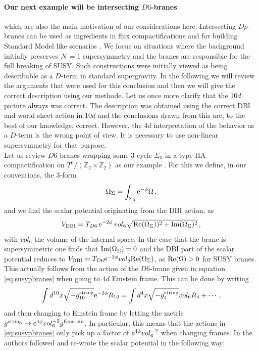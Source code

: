 \documentclass[12pt]{report}
\newcommand{\be}{\begin{equation}}
\newcommand{\ee}{\end{equation}}
\def\rme{{\rm e}}
\def\rmre{{\rm Re}}
\def\rmim{{\rm Im}}
\begin{document}
\paragraph{Our next example will be intersecting $D6$-branes} which are also the main motivation of our considerations here. Intersecting $Dp$-branes can be used as ingredients in flux compactifications and for building Standard Model like scenarios \cite{Blumenhagen:2006ci,Blumenhagen:2005mu}. We focus on situations where the background initially preserves $\mathcal{N}=1$ supersymmetry and the branes are responsible for the full breaking of SUSY. Such constructions were initially viewed as being describable as a $D$-term in standard supergravity. In the following we will review the arguments that were used for this conclusion and then we will give the correct description using our methode. Let us once more clarify that the $10d$ picture always was correct. The description was obtained using the correct DBI and world sheet action in $10d$ and the conclusions drawn from this are, to the best of our knowledge, correct. However, the $4d$ interpretation of the behavior as a $D$-term is the wrong point of view. It is necessary to use non-linear supersymmetry for that purpose.\\
Let us review $D6$-branes wrapping some 3-cycle $\Sigma_3$ in a type IIA compactification on $T^6/(\mathbb{Z}_2 \times \mathbb{Z}_2)$ as our example \cite{Villadoro:2006ia}. For this we define, in our conventions, the 3-form
\be 
\Omega_\Sigma = \int_{\Sigma_3} \rme^{-\phi} \Omega\,,
\ee
and we find the scalar potential originating from the DBI action, as
\be 
V_{\text{DBI}} = T_{D6} \, \rme^{-2\phi} \, vol_6 \sqrt{\rmre (\Omega_\Sigma))^2 + \rmim (\Omega_\Sigma)^2}\,,
\label{eq:D6DBIact}
\ee
with $vol_6$ the volume of the internal space. In the case that the brane is supersymmetric one finds that $\rmim (\Omega_\Sigma) = 0$ and the DBI part of the scalar potential reduces to $V_{\text{DBI}} =T_{D6} \rme^{-2\phi} vol_6 \rmre (\Omega_\Sigma)$, as $\rmre (\Omega) > 0$ for SUSY branes. This actually follows from the action of the $D6$-brane given in equation \eqref{eq:susypbranes} when going to $4d$ Einstein frame. This can be done by writing
\be 
\int d^{10}x \sqrt{-g^{\text{string}}_{10}} \rme^{-2\phi} R_{10} = \int d^4x \sqrt{-g_4^{\text{string}}} vol_6 R_4 + \cdots\,,
\ee
and then changing to Einstein frame by letting the metric $g^{\text{string}} \to \rme^{4 \phi} vol_6^{-2} g^{\text{Einstein}}$. In particular, this means that the actions in \eqref{eq:susypbranes} only pick up a factor of $\rme^{4 \phi} vol_6^{-2}$ when changing frames. In \cite{Villadoro:2006ia} the authors followed \cite{Blumenhagen:2002wn} and re-wrote the scalar potential in the following way:
\end{document}
